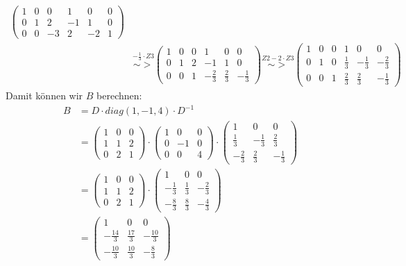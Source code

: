 \begin{itemize}
\begin{align*}
\left(\begin{array}{ccc|ccc}
1 & 0 & 0 &1&0&0\\ 0 & 1 & 2 &-1&1&0\\ 0 & 0 & -3&2&-2&1
\end{array}\right)\\
&\stackrel{-\frac{1}{3}\cdot Z3}{\sim >}
\left(\begin{array}{ccc|ccc}
1 & 0 & 0 &1&0&0\\ 0 & 1 & 2 &-1&1&0\\ 0 & 0 & 1&-\frac{2}{3}&\frac{2}{3}&-\frac{1}{3}
\end{array}\right)\stackrel{Z2-2\cdot Z3}{\sim >}
\left(\begin{array}{ccc|ccc}
1 & 0 & 0 &1&0&0\\ 0 & 1 & 0 &\frac{1}{3}&-\frac{1}{3}&-\frac{2}{3}\\ 0 & 0 & 1&\frac{2}{3}&\frac{2}{3}&-\frac{1}{3}
\end{array}\right)
\end{align*}
Damit können wir $B$ berechnen:
\begin{align*}
B&=D\cdot diag(1,-1,4)\cdot D^{-1}\\
&=\begin{pmatrix} 1 & 0 & 0 \\ 1 & 1 & 2 \\ 0 & 2 & 1\end{pmatrix}\cdot \begin{pmatrix} 1 & 0& 0 \\ 0 & -1 & 0\\ 0&0&4\end{pmatrix}\cdot  \begin{pmatrix}1&0&0\\\frac{1}{3}&-\frac{1}{3}&\frac{2}{3}\\ -\frac{2}{3}&\frac{2}{3}&-\frac{1}{3} \end{pmatrix}\\
&=\begin{pmatrix} 1 & 0 & 0 \\ 1 & 1 & 2 \\ 0 & 2 & 1\end{pmatrix}\cdot \begin{pmatrix} 1 & 0& 0 \\ -\frac{1}{3} & \frac{1}{3} & -\frac{2}{3}\\-\frac{8}{3}&\frac{8}{3}&-\frac{4}{3}\end{pmatrix}\\
&=\begin{pmatrix} 1 & 0 & 0 \\ -\frac{14}{3} & \frac{17}{3} & -\frac{10}{3} \\ -\frac{10}{3}& \frac{10}{3} & -\frac{8}{3}\end{pmatrix}
\end{align*}
\end{itemize}
%
%
%
%
%
%

